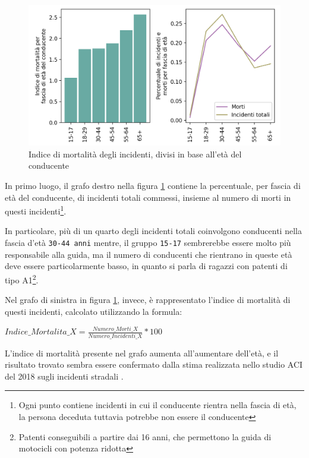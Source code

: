 \documentclass[a4paper,12pt]{report}
\newcommand{\columnstyle}[1]{\texttt{#1}}
\begin{document}
\begin{figure}
    \includegraphics[width=\linewidth]{../src/incidenti/incidenti_senza_coords/mortalita/indice_mortalita_eta.png}
    \caption{Indice di mortalità degli incidenti, divisi in base all'età del conducente}
    \label{fig:indice-mortalita-eta}
\end{figure}

In primo luogo, il grafo destro nella figura \ref{fig:indice-mortalita-eta} contiene 
la percentuale, per fascia di età del conducente, di incidenti totali commessi, insieme 
al numero di morti in questi incidenti\footnote{Ogni punto contiene incidenti in 
cui il conducente rientra nella fascia di età, la persona deceduta tuttavia potrebbe non 
essere il conducente}.

In particolare, più di un quarto degli incidenti totali coinvolgono conducenti nella 
fascia d'età \columnstyle{30-44 anni} mentre, il gruppo \columnstyle{15-17} sembrerebbe 
essere molto più responsabile alla guida, ma il numero di conducenti che rientrano 
in queste età deve essere particolarmente basso, in quanto si parla di ragazzi 
con patenti di tipo A1\footnote{Patenti conseguibili a partire dai 16 anni, 
che permettono la guida di motocicli con potenza ridotta}. 

Nel grafo di sinistra in figura \ref{fig:indice-mortalita-eta}, invece, 
è rappresentato l'indice di mortalità di questi incidenti, 
calcolato utilizzando la formula: 

\begin{center}
    $Indice\_Mortalita\_X = \displaystyle \frac{Numero\_Morti\_X}{Numero\_Incidenti\_X} * 100$ 
\end{center}

L'indice di mortalità presente nel grafo aumenta all'aumentare dell'età, 
e il risultato trovato sembra essere confermato dalla stima realizzata nello studio 
ACI del 2018 sugli incidenti stradali \cite{ACI:3}. 
\end{document}
